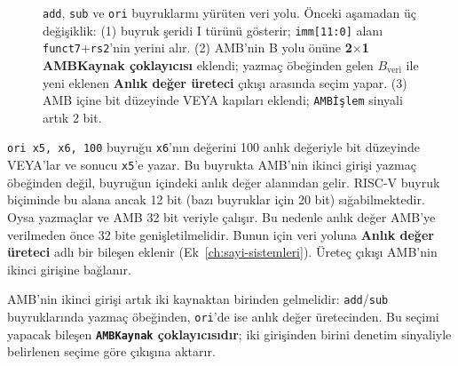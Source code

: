 \begin{figure}[htbp]
\caption[\texttt{add}, \texttt{sub} ve \texttt{ori} buyruklarını yürüten veri yolu]{\texttt{add}, \texttt{sub} ve \texttt{ori} buyruklarını yürüten veri yolu. Önceki aşamadan üç değişiklik: (1) buyruk şeridi I türünü gösterir; \texttt{imm[11:0]} alanı \texttt{funct7}+\texttt{rs2}'nin yerini alır. (2) AMB'nin B yolu önüne \textbf{2$\times$1 AMBKaynak çoklayıcısı} eklendi; yazmaç öbeğinden gelen $B_{\text{veri}}$ ile yeni eklenen \textbf{Anlık değer üreteci} çıkışı arasında seçim yapar. (3) AMB içine bit düzeyinde VEYA kapıları eklendi; \texttt{AMBİşlem} sinyali artık 2 bit.}
\label{fig:vy-ori}
\end{figure}

\texttt{ori x5, x6, 100} buyruğu \texttt{x6}'nın değerini 100 anlık değeriyle bit düzeyinde VEYA'lar ve sonucu \texttt{x5}'e yazar. Bu buyrukta AMB'nin ikinci girişi yazmaç öbeğinden değil, buyruğun içindeki anlık değer alanından gelir. RISC-V buyruk biçiminde bu alana ancak 12 bit (bazı buyruklar için 20 bit) sığabilmektedir. Oysa yazmaçlar ve AMB 32 bit veriyle çalışır. Bu nedenle anlık değer AMB'ye verilmeden önce 32 bite genişletilmelidir. Bunun için veri yoluna \textbf{Anlık değer üreteci} adlı bir bileşen eklenir (Ek~\ref{ch:sayi-sistemleri}). Üreteç çıkışı AMB'nin ikinci girişine bağlanır.

AMB'nin ikinci girişi artık iki kaynaktan birinden gelmelidir: \texttt{add}/\texttt{sub} buyruklarında yazmaç öbeğinden, \texttt{ori}'de ise anlık değer üretecinden. Bu seçimi yapacak bileşen \textbf{\texttt{AMBKaynak} çoklayıcısıdır}; iki girişinden birini denetim sinyaliyle belirlenen seçime göre çıkışına aktarır.

